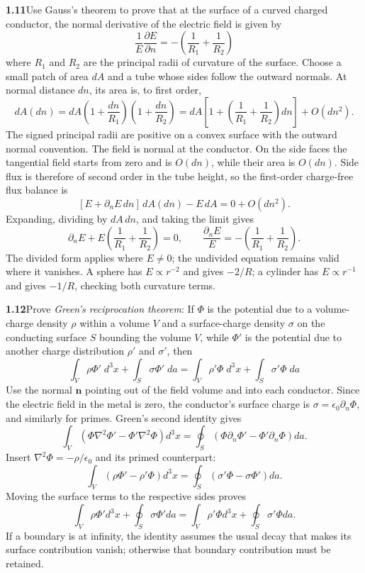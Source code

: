 \par\bigskip
\noindent\textbf{1.11}\quad Use Gauss's theorem to prove that at the surface of a curved charged conductor, the normal derivative of the electric field is given by
\[
\frac{1}{E}\frac{\partial E}{\partial n} = -\left(\frac{1}{R_{1}}+\frac{1}{R_{2}}\right)
\]
where $R_{1}$ and $R_{2}$ are the principal radii of curvature of the surface.
\solution
Choose a small patch of area $dA$ and a tube whose sides follow the outward
normals. At normal distance $dn$, its area is, to first order,
\[
dA(dn)=dA\left(1+\frac{dn}{R_1}\right)
                 \left(1+\frac{dn}{R_2}\right)
=dA\left[1+\left(\frac1{R_1}+\frac1{R_2}\right)dn\right]+O(dn^2).
\]
The signed principal radii are positive on a convex surface with the outward
normal convention. The field is normal at the conductor. On the side faces the tangential field starts from zero and is $O(dn)$,
while their area is $O(dn)$. Side flux is therefore of
second order in the tube height, so the first-order charge-free flux balance is
\[
[E+\partial_nE\,dn]\,dA(dn)-E\,dA=0+O(dn^2).
\]
Expanding, dividing by $dA\,dn$, and taking the limit gives
\[
\partial_nE+E\left(\frac1{R_1}+\frac1{R_2}\right)=0,
\qquad
\boxed{\frac{\partial_nE}{E}=-\left(\frac1{R_1}+\frac1{R_2}\right).}
\]
The divided form applies where $E\ne0$; the undivided equation remains valid
where it vanishes. A sphere has $E\propto r^{-2}$ and gives $-2/R$; a
cylinder has $E\propto r^{-1}$ and gives $-1/R$, checking both curvature terms.


\par\bigskip
\noindent\textbf{1.12}\quad Prove \emph{Green's reciprocation theorem}: If $\Phi$ is the potential due to a volume-charge density $\rho$ within a volume $V$ and a surface-charge density $\sigma$ on the conducting surface $S$ bounding the volume $V$, while $\Phi'$ is the potential due to another charge distribution $\rho'$ and $\sigma'$, then
\[
\int_{V}\rho\Phi'\;d^{3}x + \int_{S}\sigma\Phi'\;da = \int_{V}\rho'\Phi\;d^{3}x + \int_{S}\sigma'\Phi\;da
\]
\solution
Use the normal $\mathbf n$ pointing out of the field volume and into each
conductor. Since the electric field in the metal is zero, the conductor's
surface charge is $\sigma=\epsilon_0\partial_n\Phi$, and similarly for primes.
Green's second identity gives
\[
\int_V(\Phi\nabla^2\Phi'-\Phi'\nabla^2\Phi)d^3x
=\oint_S(\Phi\partial_n\Phi'-\Phi'\partial_n\Phi)da.
\]
Insert $\nabla^2\Phi=-\rho/\epsilon_0$ and its primed counterpart:
\[
\int_V(\rho\Phi'-\rho'\Phi)d^3x
=\oint_S(\sigma'\Phi-\sigma\Phi')da.
\]
Moving the surface terms to the respective sides proves
\[
\boxed{\int_V\rho\Phi'd^3x+\oint_S\sigma\Phi'da
=\int_V\rho'\Phi d^3x+\oint_S\sigma'\Phi da.}
\]
If a boundary is at infinity, the identity assumes the usual decay that makes
its surface contribution vanish; otherwise that boundary contribution must be retained.


